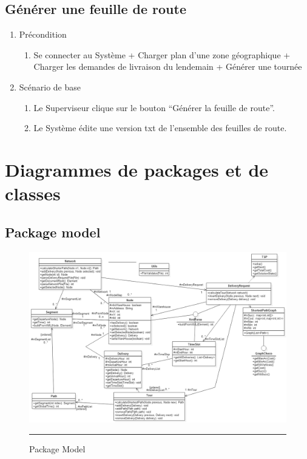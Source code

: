 \subsection{Générer une feuille de route}

\begin{enumerate}
\item Précondition
\begin{enumerate}
\item Se connecter au Système + Charger plan d’une zone géographique + Charger les demandes de livraison du lendemain + Générer une tournée

\end{enumerate}


\item Scénario de base 
\begin{enumerate}
\item Le Superviseur clique sur le bouton “Générer la feuille de route”.
\item Le Système édite une version txt de l’ensemble des feuilles de route. 
\end{enumerate}
\end{enumerate}




\clearpage
\section{Diagrammes de packages et de classes}
\subsection{Package model}
\begin{figure}[H]
\centering
	\centering
		\includegraphics[width=\textwidth,height=\textheight,keepaspectratio, angle=90]{Figures/modele}
		\rule{35em}{0.5pt}
	\caption[Model]{Package Model}
\end{figure}

